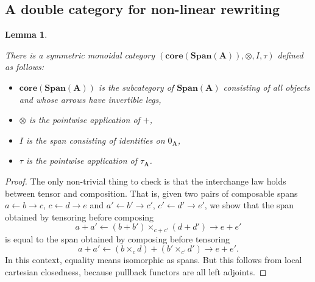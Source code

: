 \documentclass{amsart}
\newcommand{\A}{\cat{A}}
\newcommand{\core}{\mathbf{core}}
\newcommand{\cat}[1]{\mathbf{#1}}
\newcommand{\Span}{\mathbf{Span}}
\newtheorem{lemma}[theorem]{Lemma}
\theoremstyle{remark}
\theoremstyle{definition}
\begin{document}

\subsection{A double category for non-linear rewriting}
\label{sec:dbl-cat-nonlinr-rewr}


\begin{lemma} \label{thm_dbl-rewr-obcat}

  There is a symmetric monoidal category
  $ ( \core (\Span (\A)) , \otimes , I , \tau ) $ defined as follows:

  \begin{itemize}
    \item $ \core (\Span (\A)) $ is the subcategory of $ \Span (\A) $
      consisting of all objects and whose arrows have invertible legs,
    \item $ \otimes $ is the pointwise application of $ + $,
    \item $ I $ is the span consisting of identities on $ 0_{\A} $,
    \item $ \tau $ is the pointwise application of $ \tau_{\A} $.
  \end{itemize}
    
\end{lemma}

\begin{proof}
  
  The only non-trivial thing to check is that the interchange law
  holds between tensor and composition.  That is, given two pairs of
  composable spans $ a \gets b \to c $, $ c \gets d \to e $ and
  $ a' \gets b' \to c' $, $ c' \gets d' \to e' $, we show that the
  span obtained by tensoring before composing
  \[
    a + a' \gets (b + b') \times_{c + c'} (d + d') \to e + e'
  \]
  is equal to the span obtained by composing before tensoring
  \[
    a + a' \gets (b \times_{c} d) + (b' \times_{c'} d') \to e + e'.
  \]
  In this context, equality means isomorphic as spans. But this
  follows from local cartesian closedness, because pullback functors
  are all left adjoints.
  
\end{proof}
\end{document}

